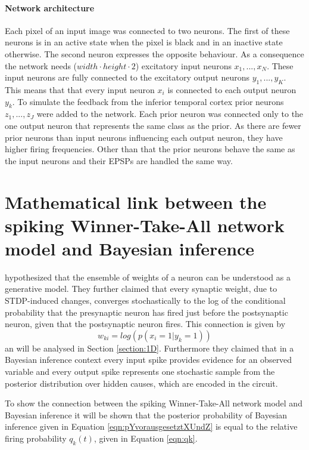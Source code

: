 \paragraph{Network architecture}
Each pixel of an input image was connected to two neurons. The first of these neurons is in an active state when the pixel is black and in an inactive state otherwise. The second neuron expresses the opposite behaviour. As a consequence the network needs ($width \cdot height \cdot 2$) excitatory input neurons $x_1,...,x_N$. These input neurons are fully connected to the excitatory output neurons $y_1,...,y_K$. This means that that every input neuron $x_i$ is connected to each output neuron $y_k$. 
To simulate the feedback from the inferior temporal cortex prior neurons $z_1,...,z_J$ were added to the network. Each prior neuron was connected only to the one  output neuron that represents the same class as the prior. As there are fewer prior neurons than input neurons influencing each output neuron, they have higher firing frequencies. Other than that the prior neurons behave the same as the input neurons and their EPSPs are handled the same way.

\section{Mathematical link between the spiking Winner-Take-All network model and Bayesian inference}
\label{linkNetworkBayes}

\citet{nessler} hypothesized that the ensemble of weights of a neuron can be understood as a generative model. They further claimed that every synaptic weight, due to STDP-induced changes,  converges stochastically to the log of the conditional probability that the presynaptic neuron has fired just before the postsynaptic neuron, given that the postsynaptic neuron fires. This connection is given by
\begin{equation}
 w_{ki} = log(p(x_i = 1 | y_k = 1))
\end{equation}
an will be analysed in Section \ref{section:1D}.
Furthermore they claimed that in a Bayesian inference context every input spike provides evidence for an observed variable and every output spike represents one stochastic sample from the posterior distribution over hidden causes, which are encoded in the circuit. 

To show the connection between the spiking Winner-Take-All network model and Bayesian inference it will be shown that the posterior probability of Bayesian inference given in Equation \ref{eqn:pYvorausgesetztXUndZ} is equal to the relative firing probability $q_k(t)$, given in Equation \ref{eqn:qk}.

